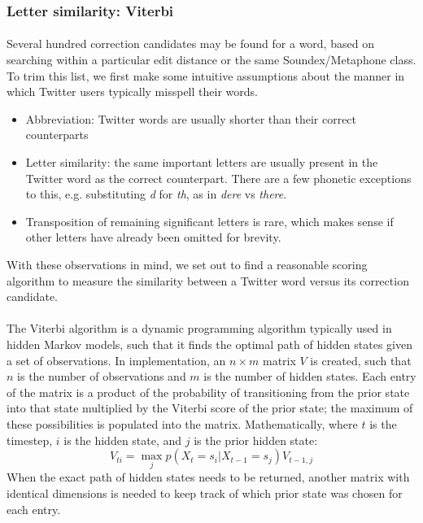 \documentclass[twocolumn,10pt]{article}
\begin{document}
\subsubsection*{Letter similarity: Viterbi}
\paragraph{} Several hundred correction candidates may be found for a word, based on searching within a particular edit distance or the same Soundex/Metaphone class. To trim this list, we first make some intuitive assumptions about the manner in which Twitter users typically misspell their words.
\begin{itemize}
\item Abbreviation: Twitter words are usually shorter than their correct counterparts
\item Letter similarity: the same important letters are usually present in the Twitter word as the correct counterpart. There are a few phonetic exceptions to this, e.g. substituting \textit{d} for \textit{th}, as in \textit{dere} vs \textit{there}.
\item Transposition of remaining significant letters is rare, which makes sense if other letters have already been omitted for brevity.
\end{itemize}
With these observations in mind, we set out to find a reasonable scoring algorithm to measure the similarity between a Twitter word versus its correction candidate.

\paragraph{} The Viterbi algorithm is a dynamic programming algorithm typically used in hidden Markov models, such that it finds the optimal path of hidden states given a set of observations. In implementation, an $n\times m$ matrix $V$ is created, such that $n$ is the number of observations and $m$ is the number of hidden states. Each entry of the matrix is a product of the probability of transitioning from the prior state into that state multiplied by the Viterbi score of the prior state; the maximum of these possibilities is populated into the matrix. Mathematically, where $t$ is the timestep, $i$ is the hidden state, and $j$ is the prior hidden state:
$$V_{ti} = \max\limits_j p(X_t = s_i | X_{t-1} = s_j) V_{t-1,j}$$
When the exact path of hidden states needs to be returned, another matrix with identical dimensions is needed to keep track of which prior state was chosen for each entry.
\end{document}
